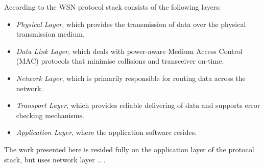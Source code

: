 According to \cite{SensorSurveyAkyildiz:2002} the WSN protocol stack consists
of the following layers:

\begin{itemize}
\item \emph{Physical Layer}, which provides the transmission of data over the physical transmission medium.
\item \emph{Data Link Layer}, which deals with power-aware Medium Access Control (MAC) protocols that minimise collisions and transceiver on-time.
\item \emph{Network Layer}, which is primarily responsible for
routing data across the network.
\item \emph{Transport Layer}, which provides reliable delivering of data and
supports error checking mechanisms.
\item \emph{Application Layer}, where the application software resides.
\end{itemize}

The work presented here is resided fully on the application layer of the
protocol stack, but uses network layer .. . %





